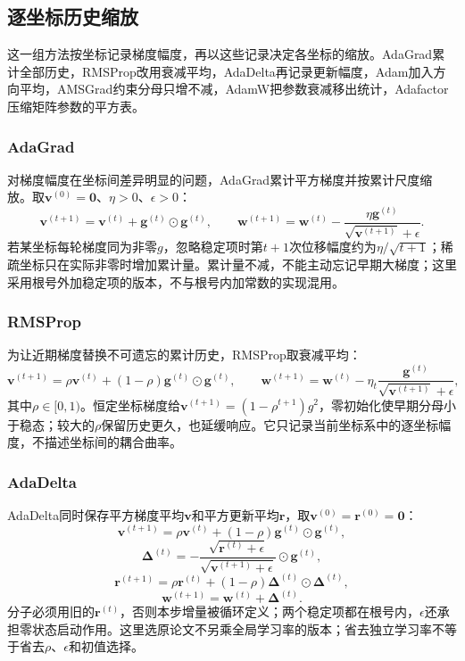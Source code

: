 \subsection{逐坐标历史缩放}
\label{sec:opt-per-coordinate-scaling}

这一组方法按坐标记录梯度幅度，再以这些记录决定各坐标的缩放。AdaGrad累计全部历史，RMSProp改用衰减平均，AdaDelta再记录更新幅度，Adam加入方向平均，AMSGrad约束分母只增不减，AdamW把参数衰减移出统计，Adafactor压缩矩阵参数的平方表。

\subsubsection{AdaGrad}

对梯度幅度在坐标间差异明显的问题，AdaGrad累计平方梯度并按累计尺度缩放。取$\bm v^{(0)}=\bm0$、$\eta>0$、$\epsilon>0$：
\[
 \bm v^{(t+1)}=\bm v^{(t)}+\bm g^{(t)}\odot\bm g^{(t)},\qquad
 \bm w^{(t+1)}=\bm w^{(t)}
 -\frac{\eta\bm g^{(t)}}{\sqrt{\bm v^{(t+1)}}+\epsilon}.
\]
若某坐标每轮梯度同为非零$g$，忽略稳定项时第$t+1$次位移幅度约为$\eta/\sqrt{t+1}$；稀疏坐标只在实际非零时增加累计量。累计量不减，不能主动忘记早期大梯度；这里采用根号外加稳定项的版本，不与根号内加常数的实现混用。

\subsubsection{RMSProp}

为让近期梯度替换不可遗忘的累计历史，RMSProp取衰减平均：
\[
 \bm v^{(t+1)}=\rho\bm v^{(t)}+(1-\rho)\bm g^{(t)}\odot\bm g^{(t)},\qquad
 \bm w^{(t+1)}=\bm w^{(t)}
 -\eta_t\frac{\bm g^{(t)}}{\sqrt{\bm v^{(t+1)}}+\epsilon},
\]
其中$\rho\in[0,1)$。恒定坐标梯度给$\bm v^{(t+1)}=(1-\rho^{t+1})g^2$，零初始化使早期分母小于稳态；较大的$\rho$保留历史更久，也延缓响应。它只记录当前坐标系中的逐坐标幅度，不描述坐标间的耦合曲率。

\subsubsection{AdaDelta}

AdaDelta同时保存平方梯度平均$\bm v$和平方更新平均$\bm r$，取$\bm v^{(0)}=\bm r^{(0)}=\bm0$：
\[
 \bm v^{(t+1)}=\rho\bm v^{(t)}+(1-\rho)\bm g^{(t)}\odot\bm g^{(t)},
\]
\[
 \bm\Delta^{(t)}
 =-\frac{\sqrt{\bm r^{(t)}+\epsilon}}{\sqrt{\bm v^{(t+1)}+\epsilon}}
 \odot\bm g^{(t)},
\]
\[
 \bm r^{(t+1)}=\rho\bm r^{(t)}+(1-\rho)\bm\Delta^{(t)}\odot\bm\Delta^{(t)},
\]
\[
 \bm w^{(t+1)}=\bm w^{(t)}+\bm\Delta^{(t)}.
\]
分子必须用旧的$\bm r^{(t)}$，否则本步增量被循环定义；两个稳定项都在根号内，$\epsilon$还承担零状态启动作用。这里选原论文不另乘全局学习率的版本；省去独立学习率不等于省去$\rho$、$\epsilon$和初值选择。

